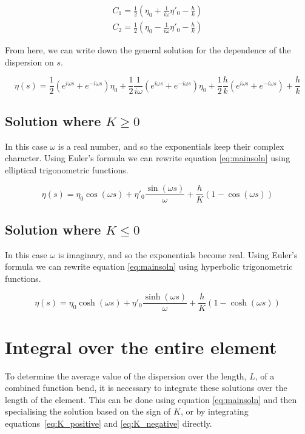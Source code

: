 \documentclass[]{article}
\begin{document}
  \begin{eqnarray}
    C_1 = \frac{1}{2}\left(\eta_0 + \frac{1}{i\omega}\eta'_0 - \frac{h}{k}\right) \\
    C_2 = \frac{1}{2}\left(\eta_0 - \frac{1}{i\omega}\eta'_0 - \frac{h}{k}\right)
  \end{eqnarray}
  
  From here, we can write down the general solution for the dependence of the dispersion on $s$.

  \begin{equation}
    \eta\left(s\right) = \frac{1}{2}\left(e^{i\omega s} + e^{-i\omega s}\right)\eta_0
            + \frac{1}{2}\frac{1}{i\omega}\left(e^{i\omega s} + e^{-i\omega s}\right)\eta_0
            + \frac{1}{2}\frac{h}{k}\left(e^{i\omega s} + e^{-i\omega s}\right)
            + \frac{h}{k}
    \label{eq:mainsoln}
  \end{equation}

  \subsection{Solution where $K\geq 0$}
  In this case $\omega$ is a real number, and so the exponentials keep their complex character. Using Euler's formula we can rewrite equation \ref{eq:mainsoln} using elliptical trigonometric functions.

  \begin{equation}
    \eta\left(s\right) = \eta_0\cos\left(\omega s\right) + \eta'_0\frac{\sin\left(\omega s\right)}{\omega} + \frac{h}{K}\left(1 - \cos\left(\omega s\right)\right)
    \label{eq:K_positive}
  \end{equation}
  
  \subsection{Solution where $K\leq 0$}
  In this case $\omega$ is imaginary, and so the exponentials become real. Using Euler's formula we can rewrite equation \ref{eq:mainsoln} using hyperbolic trigonometric functions.

  \begin{equation}
    \eta\left(s\right) = \eta_0\cosh\left(\omega s\right) + \eta'_0\frac{\sinh\left(\omega s\right)}{\omega} + \frac{h}{K}\left(1 - \cosh\left(\omega s\right)\right)
    \label{eq:K_negative}
  \end{equation}

  \section{Integral over the entire element}
  To determine the average value of the dispersion over the length, $L$, of a combined function bend, it is necessary to integrate these solutions over the length of the element.  This can be done using equation \ref{eq:mainsoln} and then specialising the solution based on the sign of $K$, or by integrating equations~\ref{eq:K_positive} and \ref{eq:K_negative} directly.
\end{document}
